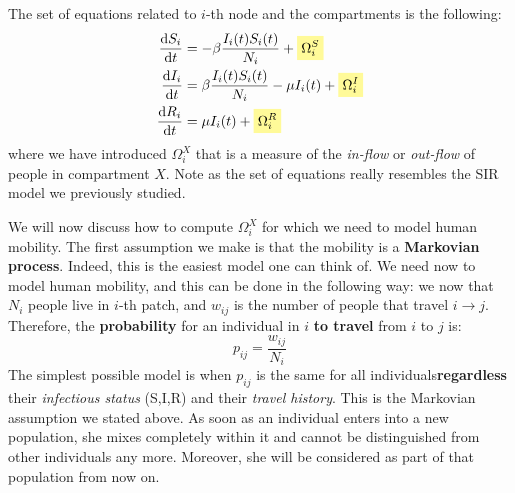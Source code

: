 \documentclass[../main/main.tex]{subfiles}
\begin{document}
The set of equations related to $i$-th node and the compartments is the following:
\begin{subequations}
\begin{align}
    \dv{S_i}{t}  &= -\beta \frac{I_i(t)S_i(t)}{N_i} + \mathcolorbox{yellow!40}{\Omega_i^S}\\
    \dv{I_i}{t} &= \beta \frac{I_i(t)S_i(t)}{N_i}  - \mu I_i(t) + \mathcolorbox{yellow!40}{\Omega_i^I}\\
    \dv{R_i}{t} &= \mu I_i (t) + \mathcolorbox{yellow!40}{\Omega_i^R}
\end{align}
\end{subequations}
where we have introduced $\Omega_i^X$ that is a measure of the \textit{in-flow} or \textit{out-flow} of people in compartment $X$. Note as the set of equations really resembles the SIR model we previously studied.


We will now discuss how to compute $\Omega_i^X$ for which we need to model human mobility. The first assumption we make is that the mobility is a \textbf{Markovian process}. Indeed, this is the easiest model one can think of. We need now to model human mobility, and this can be done in the following way: we now that $N_i$ people live in $i$-th patch, and $w_{ij}$ is the number of people that travel $i \to j$. Therefore, the \textbf{probability} for an individual in $i$ \textbf{to travel} from $i$ to $j$ is:
\begin{equation}
    p_{ij} = \frac{w_{ij}}{N_i}
\end{equation}
The simplest possible model is when $p_{ij}$ is the same for all individuals\textbf{regardless} their \textit{infectious status} (S,I,R) and their \textit{travel history}. This is the Markovian assumption we stated above. As soon as an individual enters into a new population, she mixes completely within it and cannot be distinguished from other individuals any more. Moreover, she will be considered as part of that population from now on.
\end{document}
